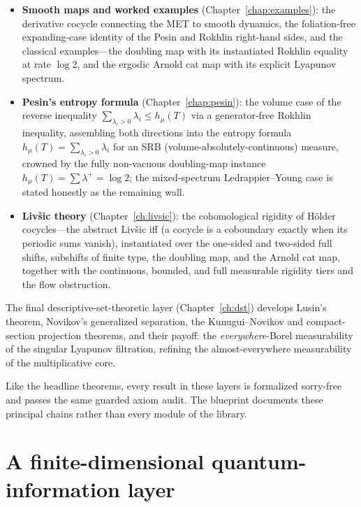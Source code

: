 \begin{itemize}
    and a Bernoulli-suspension witness whose R\'enyi spectrum is provably
    \(q\)-dependent.
  \item \textbf{Smooth maps and worked examples} (Chapter~\ref{chap:examples}): the
    derivative cocycle connecting the MET to smooth dynamics, the foliation-free
    expanding-case identity of the Pesin and Rokhlin right-hand sides, and the classical
    examples---the doubling map with its instantiated Rokhlin equality at rate
    \(\log 2\), and the ergodic Arnold cat map with its explicit Lyapunov spectrum.
  \item \textbf{Pesin's entropy formula} (Chapter~\ref{chap:pesin}): the volume case of the
    reverse inequality \(\sum_{\lambda_i>0}\lambda_i\le h_\mu(T)\) via a generator-free
    Rokhlin inequality, assembling both directions into the entropy formula
    \(h_\mu(T)=\sum_{\lambda_i>0}\lambda_i\) for an SRB (volume-absolutely-continuous)
    measure, crowned by the fully non-vacuous doubling-map instance
    \(h_\mu(T)=\sum\lambda^{+}=\log 2\); the mixed-spectrum Ledrappier--Young case is stated
    honestly as the remaining wall.
  \item \textbf{Livšic theory} (Chapter~\ref{ch:livsic}): the cohomological rigidity of
    H\"older cocycles---the abstract Livšic iff (a cocycle is a coboundary exactly when its
    periodic sums vanish), instantiated over the one-sided and two-sided full shifts,
    subshifts of finite type, the doubling map, and the Arnold cat map, together with the
    continuous, bounded, and full measurable rigidity tiers and the flow obstruction.
\end{itemize}

The final descriptive-set-theoretic layer (Chapter~\ref{ch:dst}) develops Lusin's theorem,
Novikov's generalized separation, the Kunugui--Novikov and compact-section projection
theorems, and their payoff: the \emph{everywhere}-Borel measurability of the singular
Lyapunov filtration, refining the almost-everywhere measurability of the multiplicative core.

Like the headline theorems, every result in these layers is formalized sorry-free and
passes the same guarded axiom audit. The blueprint documents these principal chains
rather than every module of the library.

\section{A finite-dimensional quantum-information layer}

